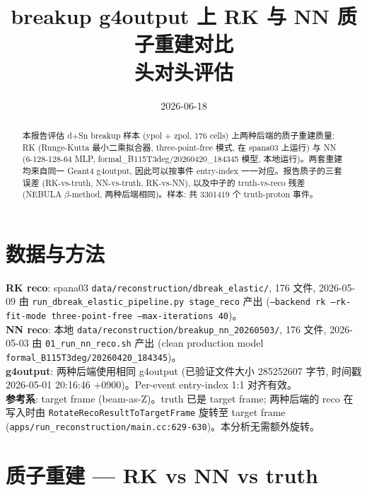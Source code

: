 \documentclass[11pt]{ctexart}
\title{breakup g4output 上 RK 与 NN 质子重建对比 \\ \large 头对头评估}
\date{2026-06-18}
\begin{document}
\maketitle

\begin{abstract}
本报告评估 d+Sn breakup 样本 (ypol + zpol, 176 cells) 上两种后端的质子重建质量: RK (Runge-Kutta 最小二乘拟合器, three-point-free 模式, 在 spana03 上运行) 与 NN (6-128-128-64 MLP, formal\_B115T3deg/20260420\_184345 模型, 本地运行)。两套重建均来自同一 Geant4 g4output, 因此可以按事件 entry-index 一一对应。报告质子的三套误差 (RK-vs-truth, NN-vs-truth, RK-vs-NN), 以及中子的 truth-vs-reco 残差 (NEBULA $\beta$-method, 两种后端相同)。样本: 共 3301419 个 truth-proton 事件。
\end{abstract}

\section{数据与方法}
\textbf{RK reco}: spana03 \texttt{data/reconstruction/dbreak\_elastic/}, 176 文件, 2026-05-09 由 \texttt{run\_dbreak\_elastic\_pipeline.py stage\_reco} 产出 (\texttt{--backend rk --rk-fit-mode three-point-free --max-iterations 40})。\\
\textbf{NN reco}: 本地 \texttt{data/reconstruction/breakup\_nn\_20260503/}, 176 文件, 2026-05-03 由 \texttt{01\_run\_nn\_reco.sh} 产出 (clean production model \texttt{formal\_B115T3deg/20260420\_184345})。\\
\textbf{g4output}: 两种后端使用相同 g4output (已验证文件大小 285252607 字节, 时间戳 2026-05-01 20:16:46 +0900)。Per-event entry-index 1:1 对齐有效。\\
\textbf{参考系}: target frame (beam-as-Z)。truth 已是 target frame; 两种后端的 reco 在写入时由 \texttt{RotateRecoResultToTargetFrame} 旋转至 target frame (\texttt{apps/run\_reconstruction/main.cc:629-630})。本分析无需额外旋转。\\

\section{质子重建 --- RK vs NN vs truth}
\end{document}

